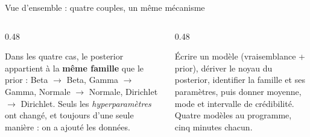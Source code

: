 \begin{frame}{Vue d'ensemble : quatre couples, un même mécanisme}

\vspace{-4mm}
\begin{columns}[t]
\begin{column}{0.48\textwidth}
\begin{kbox}
Dans les quatre cas, le posterior appartient à la \textbf{même famille} que le
prior : Beta $\to$ Beta, Gamma $\to$ Gamma, Normale $\to$ Normale,
Dirichlet $\to$ Dirichlet. Seuls les \emph{hyperparamètres} ont changé, et
toujours d'une seule manière : on a ajouté les données.
\end{kbox}
\end{column}
\begin{column}{0.48\textwidth}
\begin{ebox}
Écrire un modèle (vraisemblance + prior), dériver le noyau du posterior,
identifier la famille et ses paramètres, puis donner moyenne, mode et
intervalle de crédibilité. Quatre modèles au programme, cinq minutes chacun.
\end{ebox}
\end{column}
\end{columns}
\end{frame}

